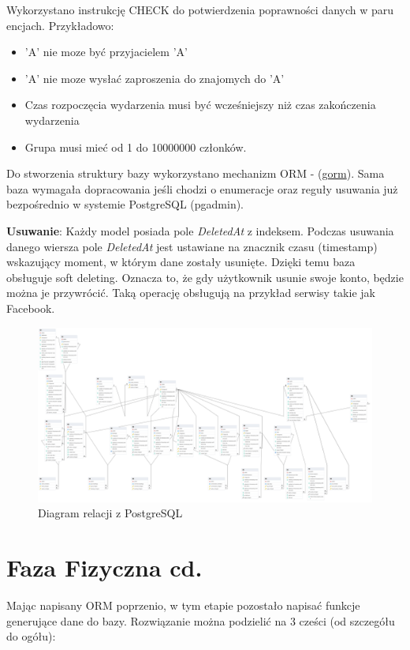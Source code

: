 \documentclass{article}
\begin{document}
Wykorzystano instrukcję CHECK do potwierdzenia poprawności danych w paru encjach. Przykładowo:
\begin{itemize}
    \item 'A' nie moze być przyjacielem 'A'
    \item 'A' nie moze wysłać zaproszenia do znajomych do 'A'
    \item Czas rozpoczęcia wydarzenia musi być wcześniejszy niż czas zakończenia wydarzenia
    \item Grupa musi mieć od 1 do 10000000 członków.
\end{itemize}

Do stworzenia struktury bazy wykorzystano mechanizm ORM - (\href{https://gorm.io/}{gorm}). Sama baza wymagała dopracowania jeśli chodzi o enumeracje oraz reguły usuwania już bezpośrednio w systemie PostgreSQL (pgadmin). 

\textbf{Usuwanie}: Każdy model posiada pole \textit{DeletedAt} z indeksem. Podczas usuwania danego wiersza pole \textit{DeletedAt} jest ustawiane na znacznik czasu (timestamp) wskazujący moment, w którym dane zostały usunięte. Dzięki temu baza obsługuje soft deleting. Oznacza to, że gdy użytkownik usunie swoje konto, będzie można je przywrócić. Taką operację obsługują na przykład serwisy takie jak Facebook.

\begin{figure}[H]
    \centering
    \includegraphics[width=\linewidth]{images/postgres_diagram.png}
    \caption{Diagram relacji z PostgreSQL}
    \label{fig:postgres}
\end{figure}


\section{Faza Fizyczna cd.}

\quad Mając napisany ORM poprzenio, w tym etapie pozostało napisać funkcje generujące dane do bazy. Rozwiązanie można podzielić na 3 cześci (od szczegółu do ogółu):
\end{document}

